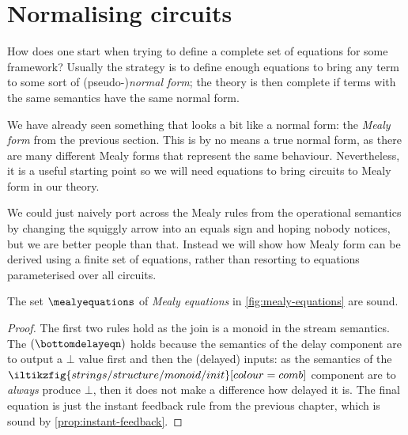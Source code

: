 \section{Normalising circuits}

How does one start when trying to define a complete set of equations for some
framework?
Usually the strategy is to define enough equations to bring any term to some
sort of (pseudo-)\emph{normal form}; the theory is then complete if terms with
the same semantics have the same normal form.

We have already seen something that looks a bit like a normal form: the
\emph{Mealy form} from the previous section.
This is by no means a true normal form, as there are many different Mealy forms
that represent the same behaviour.
Nevertheless, it is a useful starting point so we will need equations to bring
circuits to Mealy form in our theory.

We could just naively port across the Mealy rules from the operational semantics
by changing the squiggly arrow into an equals sign and hoping nobody notices,
but we are better people than that.
Instead we will show how Mealy form can be derived using a finite set of
equations, rather than resorting to equations parameterised over all circuits.



\begin{definition}
    The set \(\mealyequations\) of \emph{Mealy equations} in
    \cref{fig:mealy-equations} are sound.
\end{definition}
\begin{proof}
    The first two rules hold as the join is a monoid in the stream semantics.
    The \((\bottomdelayeqn)\) holds because the semantics of the delay
    component are to output a \(\bot\) value first and then the (delayed)
    inputs: as the semantics of the \(
    \iltikzfig{strings/structure/monoid/init}[colour=comb]
    \) component are to \emph{always} produce \(\bot\), then it does not make a
    difference how delayed it is.
    The final equation is just the instant feedback rule from the previous
    chapter, which is sound by \cref{prop:instant-feedback}.
\end{proof}

